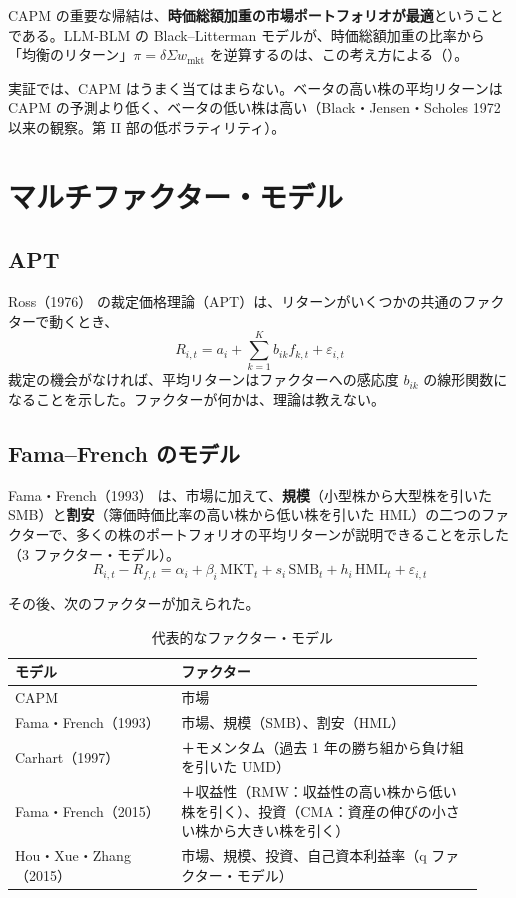 CAPM の重要な帰結は、\textbf{時価総額加重の市場ポートフォリオが最適}ということである。LLM-BLM の Black--Litterman モデルが、時価総額加重の比率から「均衡のリターン」$\pi = \delta \Sigma w_{\text{mkt}}$ を逆算するのは、この考え方による（）。

実証では、CAPM はうまく当てはまらない。ベータの高い株の平均リターンは CAPM の予測より低く、ベータの低い株は高い（Black・Jensen・Scholes 1972 以来の観察。第 II 部の低ボラティリティ）。

\section{マルチファクター・モデル}

\subsection{APT}

Ross（1976）\cite{ross1976} の裁定価格理論（APT）は、リターンがいくつかの共通のファクターで動くとき、
\begin{equation}
R_{i,t} = a_i + \sum_{k=1}^{K} b_{ik} f_{k,t} + \varepsilon_{i,t}
\end{equation}
裁定の機会がなければ、平均リターンはファクターへの感応度 $b_{ik}$ の線形関数になることを示した。ファクターが何かは、理論は教えない。

\subsection{Fama--French のモデル}

Fama・French（1993）\cite{ff1993} は、市場に加えて、\textbf{規模}（小型株から大型株を引いた SMB）と\textbf{割安}（簿価時価比率の高い株から低い株を引いた HML）の二つのファクターで、多くの株のポートフォリオの平均リターンが説明できることを示した（3 ファクター・モデル）。
\begin{equation}
R_{i,t} - R_{f,t} = \alpha_i + \beta_i\,\mathrm{MKT}_t + s_i\,\mathrm{SMB}_t + h_i\,\mathrm{HML}_t + \varepsilon_{i,t}
\end{equation}

その後、次のファクターが加えられた。

\begin{table}[H]
\centering\small
\caption{代表的なファクター・モデル}
\label{tab:factormodels}
\begin{tabular}{@{}P{0.33\linewidth}P{0.6\linewidth}@{}}
\toprule
モデル & ファクター \\
\midrule
CAPM & 市場 \\
Fama・French（1993） & 市場、規模（SMB）、割安（HML） \\
Carhart（1997）\cite{carhart1997} & ＋モメンタム（過去 1 年の勝ち組から負け組を引いた UMD） \\
Fama・French（2015）\cite{ff2015} & ＋収益性（RMW：収益性の高い株から低い株を引く）、投資（CMA：資産の伸びの小さい株から大きい株を引く） \\
Hou・Xue・Zhang（2015）\cite{hxz2015} & 市場、規模、投資、自己資本利益率（q ファクター・モデル） \\
\bottomrule
\end{tabular}
\end{table}


